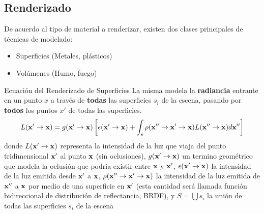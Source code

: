 \documentclass[spanish]{beamer}
\begin{document}
\subsection{Renderizado}

\begin{frame}
De acuerdo al tipo de material a renderizar, existen dos clases principales de técnicas de modelado:

\begin{block}{}
\begin{itemize}
\item Superficies (Metales, plásticos)
\item Volúmenes (Humo, fuego)
\end{itemize}
\end{block}
\end{frame}


\begin{frame}{Ecuación del Renderizado de Superficies}
La misma modela la \textbf{radiancia} entrante en un punto $x$ a través de \textbf{todas} las superficies $s_{i}$ de la escena, pasando por \textbf{todos} los puntos $x'$ de todas las superficies.
\begin{equation*}
L(\bold{x'} \rightarrow \bold{x}) =  g(\bold{x'}  \rightarrow \bold{x})  \left[ \epsilon(\bold{x'}  \rightarrow \bold{x}) + \int_{s}{\rho(\bold{x''}  \rightarrow \bold{x'}  \rightarrow \bold{x})L(\bold{x''}  \rightarrow \bold{x}) d\bold{x''}} \right]
\end{equation*}
donde $L(\bold{x'} \rightarrow \bold{x})$ representa la intensidad de la luz que viaja del punto tridimensional $\bold{x'}$ al punto $\bold{x}$ (sin oclusiones), $g(\bold{x'} \rightarrow \bold{x})$ un termino geométrico que modela la oclusión que podría existir entre $\bold{x}$ y $\bold{x'}$, $\epsilon(\bold{x'} \rightarrow \bold{x})$ la intensidad de la luz emitida desde $\bold{x'}$ a $\bold{x}$, $\rho(\bold{x''}  \rightarrow \bold{x'}  \rightarrow \bold{x})$ la intensidad de la luz emitida de $\bold{x''}$ a $\bold{x}$ por medio de una superficie en $\bold{x'}$ (esta cantidad será llamada función bidireccional de distribución de reflectancia, BRDF), y $S=\bigcup{s_{i}}$ la unión de todas las superficies $s_{i}$ de la escena
\end{frame}
\end{document}
